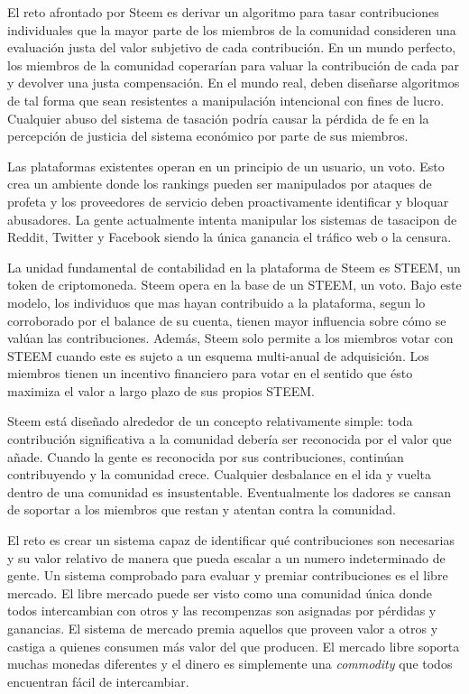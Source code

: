\documentclass[a4paper,titlepage,final]{article}
\begin{document}
El reto afrontado por Steem es derivar un algoritmo para tasar contribuciones individuales que la mayor parte de los miembros de la comunidad consideren una evaluación justa del valor subjetivo de cada contribución. En un mundo perfecto, los miembros de la comunidad coperarían para valuar la contribución de cada par y devolver una justa compensación. En el mundo real, deben diseñarse algoritmos de tal forma que sean resistentes a manipulación intencional con fines de lucro. Cualquier abuso del sistema de tasación podría causar la pérdida de fe en la percepción de justicia del sistema económico por parte de sus miembros.

Las plataformas existentes operan en un principio de un usuario, un voto. Esto crea un ambiente donde los rankings pueden ser manipulados por ataques de profeta y los proveedores de servicio deben proactivamente identificar y bloquar abusadores. La gente actualmente intenta manipular los sistemas de tasacipon de Reddit, Twitter y Facebook siendo la única ganancia el tráfico web o la censura.

La unidad fundamental de contabilidad en la plataforma de Steem es STEEM, un token de criptomoneda. Steem opera en la base de un STEEM, un voto. Bajo este modelo, los individuos que mas hayan contribuido a la plataforma, segun lo corroborado por el balance de su cuenta, tienen mayor influencia sobre cómo se valúan las contribuciones. Además, Steem solo permite a los miembros votar con STEEM cuando este es sujeto a un esquema multi-anual de adquisición. Los miembros tienen un incentivo financiero para votar en el sentido que ésto maximiza el valor a largo plazo de sus propios STEEM.

Steem está diseñado alrededor de un concepto relativamente simple: toda contribución significativa a la comunidad debería ser reconocida por el valor que añade. Cuando la gente es reconocida por sus contribuciones, continúan contribuyendo y la comunidad crece. Cualquier desbalance en el ida y vuelta dentro de una comunidad es insustentable. Eventualmente los dadores se cansan de soportar a los miembros que restan y atentan contra la comunidad.

El reto es crear un sistema capaz de identificar qué contribuciones son necesarias y su valor relativo de manera que pueda escalar a un numero indeterminado de gente. Un sistema comprobado para evaluar y premiar contribuciones es el libre mercado. El libre mercado puede ser visto como una comunidad única donde todos intercambian con otros y las recompenzas son asignadas por pérdidas y ganancias. El sistema de mercado premia aquellos que proveen valor a otros y castiga a quienes consumen más valor del que producen. El mercado libre soporta muchas monedas diferentes y el dinero es simplemente una \textit{commodity} que todos encuentran fácil de intercambiar.
\end{document}

